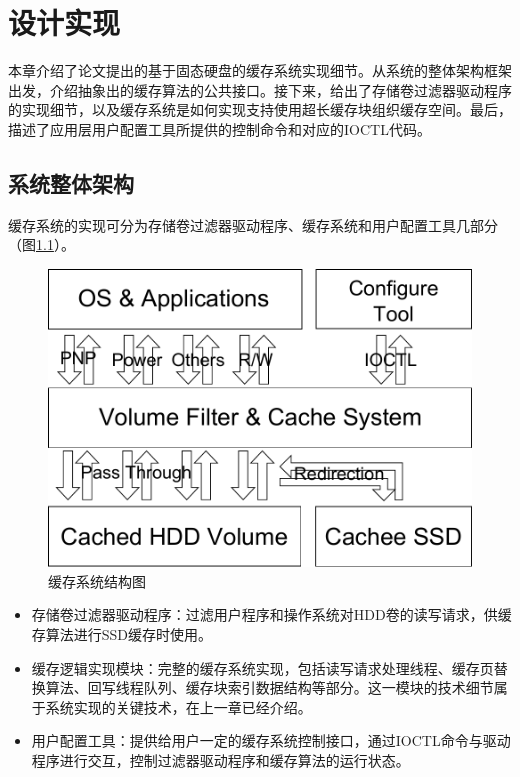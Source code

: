
\chapter{设计实现}
\label{cha:mainmatter}

本章介绍了论文提出的基于固态硬盘的缓存系统实现细节。从系统的整体架构框架出发，介绍抽象出的缓存算法的公共接口。接下来，给出了存储卷过滤器驱动程序的实现细节，以及缓存系统是如何实现支持使用超长缓存块组织缓存空间。最后，描述了应用层用户配置工具所提供的控制命令和对应的IOCTL代码。

\section{系统整体架构}
\label{sec:system_overview}

缓存系统的实现可分为存储卷过滤器驱动程序、缓存系统和用户配置工具几部分（图\ref{fig:sys-overview}）。

\begin{figure}[H]
\centering
\includegraphics[width=0.6\linewidth]{./graph/sys-overview}
\caption{缓存系统结构图}
\label{fig:sys-overview}
\end{figure}

\begin{itemize}
\item
存储卷过滤器驱动程序：过滤用户程序和操作系统对HDD卷的读写请求，供缓存算法进行SSD缓存时使用。
\item
缓存逻辑实现模块：完整的缓存系统实现，包括读写请求处理线程、缓存页替换算法、回写线程队列、缓存块索引数据结构等部分。这一模块的技术细节属于系统实现的关键技术，在上一章已经介绍。
\item
用户配置工具：提供给用户一定的缓存系统控制接口，通过IOCTL命令与驱动程序进行交互，控制过滤器驱动程序和缓存算法的运行状态。
\end{itemize}

